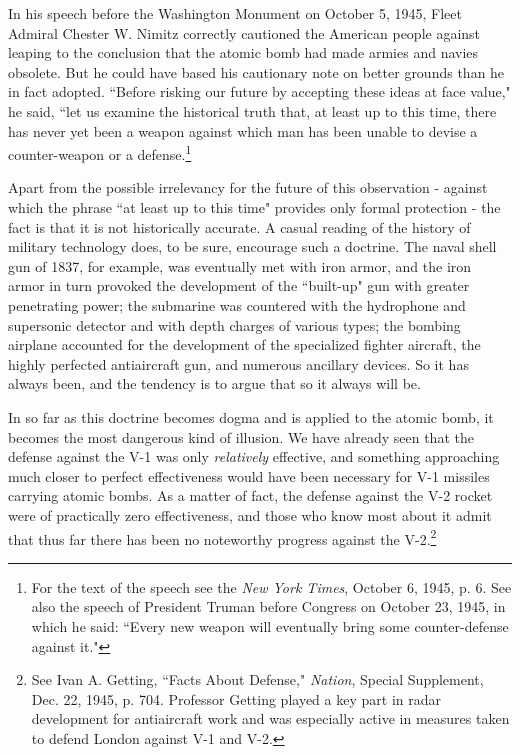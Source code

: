In his speech before the Washington Monument on October 5, 1945, Fleet Admiral Chester W. Nimitz correctly cautioned the American people against leaping to the conclusion that the atomic bomb had made armies and navies obsolete. But he could have based his cautionary note on better grounds than he in fact adopted. ``Before risking our future by accepting these ideas at face value," he said, ``let us examine the historical truth that, at least up to this time, there has never yet been a weapon against which man has been unable to devise a counter-weapon or a defense.\footnote{For the text of the speech see the \textit{New York Times}, October 6, 1945, p. 6. See also the speech of President Truman before Congress on October 23, 1945, in which he said: ``Every new weapon will eventually bring some counter-defense against it."}

Apart from the possible irrelevancy for the future of this observation - against which the phrase ``at least up to this time" provides only formal protection - the fact is that it is not historically accurate. A casual reading of the history of military technology does, to be sure, encourage such a doctrine. The naval shell gun of 1837, for example, was eventually met with iron armor, and the iron armor in turn provoked the development of the ``built-up" gun with greater penetrating power; the submarine was countered with the hydrophone and supersonic detector and with depth charges of various types; the bombing airplane accounted for the development of the specialized fighter aircraft, the highly perfected antiaircraft gun, and numerous ancillary devices. So it has always been, and the tendency is to argue that so it always will be.

In so far as this doctrine becomes dogma and is applied to the atomic bomb, it becomes the most dangerous kind of illusion. We have already seen that the defense against the V-1 was only \emph{relatively} effective, and something approaching much closer to perfect effectiveness would have been necessary for V-1 missiles carrying atomic bombs. As a matter of fact, the defense against the V-2 rocket were of practically zero effectiveness, and those who know most about it admit that thus far there has been no noteworthy progress against the V-2.\footnote{See Ivan A. Getting, ``Facts About Defense," \textit{Nation}, Special Supplement, Dec. 22, 1945, p. 704. Professor Getting played a key part in radar development for antiaircraft work and was especially active in measures taken to defend London against V-1 and V-2.}

